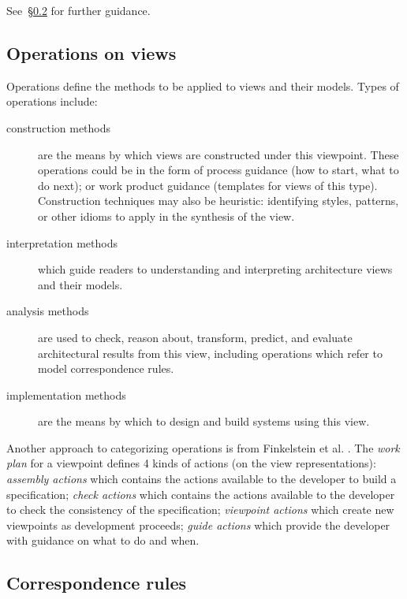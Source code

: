 
See~\S\ref{CRs} for further guidance.


\subsection{Operations on views}\label{Opns}

Operations define the methods to be applied to views and their models.
Types of operations include:

\begin{description}

\item[construction methods] are the means by which views are
  constructed under this viewpoint. These operations could be in the
  form of process guidance (how to start, what to do next); or work
  product guidance (templates for views of this type). Construction
  techniques may also be heuristic: identifying styles, patterns, or
  other idioms to apply in the synthesis of the view.

\item[interpretation methods] which guide readers to understanding
  and interpreting architecture views and their models.

\item[analysis methods] are used to check, reason about, transform,
  predict, and evaluate architectural results from this view,
  including operations which refer to model correspondence rules.

\item[implementation methods] are the means by which to design and
  build systems using this view.

\end{description}

Another approach to categorizing operations is from Finkelstein et
al. \cite{Finkelstein+1992}. The \emph{work plan} for a viewpoint
defines 4 kinds of actions (on the view representations):
\textit{assembly actions} which contains the actions available to the
developer to build a specification; \textit{check actions} which
contains the actions available to the developer to check the
consistency of the specification; \textit{viewpoint actions} which
create new viewpoints as development proceeds; \textit{guide actions}
which provide the developer with guidance on what to do and when.


\subsection{Correspondence rules}\label{CRs}

